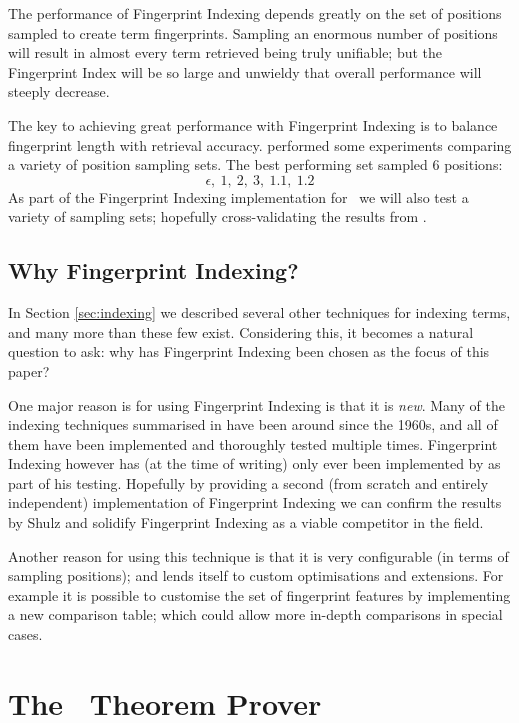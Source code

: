 The performance of Fingerprint Indexing depends greatly on the set of positions sampled
to create term fingerprints. Sampling an enormous number of positions will result in
almost every term retrieved being truly unifiable; but the Fingerprint Index will
be so large and unwieldy that overall performance will steeply decrease.

The key to achieving great performance with Fingerprint Indexing is to balance
fingerprint length with retrieval accuracy.  performed some experiments
comparing a variety of position sampling sets. The best performing set sampled
6 positions:
  \[\epsilon,\  1,\  2,\  3,\  1.1,\  1.2\]
As part of the Fingerprint Indexing implementation for \beagle\ we will also test
a variety of sampling sets; hopefully cross-validating the results from .

\subsection{Why Fingerprint Indexing?}

In Section \ref{sec:indexing} we described several other techniques for indexing
terms, and many more than these few exist. Considering this, it becomes a natural question to ask:
why has Fingerprint Indexing been chosen as the focus of this paper?

One major reason is for using Fingerprint Indexing is that it is \emph{new}. Many of the indexing
techniques summarised in \cite{indexing} have been around since the 1960s, and all of
them have been implemented and thoroughly tested multiple times. Fingerprint
Indexing however has (at the time of writing) only ever been implemented by 
as part of his testing. Hopefully by providing a second (from scratch and entirely independent)
implementation of Fingerprint Indexing we can confirm the results by Shulz and
solidify Fingerprint Indexing as a viable competitor in the field.

Another reason for using this technique is that it is very configurable (in terms
of sampling positions); and lends itself to custom optimisations and extensions.
For example it is possible to customise the set of fingerprint features by implementing a new comparison table;
which could allow more in-depth comparisons in special cases.

\section{The \Beagle\ Theorem Prover}
\label{sec:beagle}

